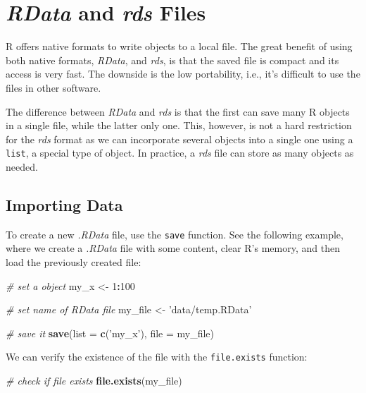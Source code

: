 \documentclass[
  12pt,
]{book}
\newenvironment{Shaded}{\begin{snugshade}}{\end{snugshade}}
\newcommand{\CommentTok}[1]{\textcolor[rgb]{0.37,0.37,0.37}{\textit{#1}}}
\newcommand{\DataTypeTok}[1]{\textcolor[rgb]{0.27,0.27,0.27}{#1}}
\newcommand{\DecValTok}[1]{\textcolor[rgb]{0.06,0.06,0.06}{#1}}
\newcommand{\KeywordTok}[1]{\textcolor[rgb]{0.27,0.27,0.27}{\textbf{#1}}}
\newcommand{\NormalTok}[1]{#1}
\newcommand{\OperatorTok}[1]{\textcolor[rgb]{0.43,0.43,0.43}{\textbf{#1}}}
\newcommand{\StringTok}[1]{\textcolor[rgb]{0.5,0.5,0.5}{#1}}
\begin{document}
\hypertarget{rdata-and-rds-files}{%
\section{\texorpdfstring{\emph{RData} and \emph{rds} Files}{RData and rds Files}}\label{rdata-and-rds-files}}

R offers native formats to write objects to a local file. The great benefit of using both native formats, \emph{RData}, and \emph{rds}, is that the saved file is compact and its access is very fast. The downside is the low portability, i.e., it's difficult to use the files in other software.  

The difference between \emph{RData} and \emph{rds} is that the first can save many R objects in a single file, while the latter only one. This, however, is not a hard restriction for the \emph{rds} format as we can incorporate several objects into a single one using a \texttt{list}, a special type of object. In practice, a \emph{rds} file can store as many objects as needed.

\hypertarget{importing-data-2}{%
\subsection{Importing Data}\label{importing-data-2}}

To create a new \emph{.RData} file, use the \texttt{save} function. See the following example, where we create a \emph{.RData} file with some content, clear R's memory, and then load the previously created file:  

\begin{Shaded}
\begin{Highlighting}[]
\CommentTok{# set a object}
\NormalTok{my_x <-}\StringTok{ }\DecValTok{1}\OperatorTok{:}\DecValTok{100}

\CommentTok{# set name of RData file}
\NormalTok{my_file <-}\StringTok{ 'data/temp.RData'}

\CommentTok{# save it}
\KeywordTok{save}\NormalTok{(}\DataTypeTok{list =} \KeywordTok{c}\NormalTok{(}\StringTok{'my_x'}\NormalTok{), }\DataTypeTok{file =}\NormalTok{ my_file)}
\end{Highlighting}
\end{Shaded}

We can verify the existence of the file with the \texttt{file.exists} function: 

\begin{Shaded}
\begin{Highlighting}[]
\CommentTok{# check if file exists}
\KeywordTok{file.exists}\NormalTok{(my_file)}
\end{Highlighting}
\end{Shaded}
\end{document}
